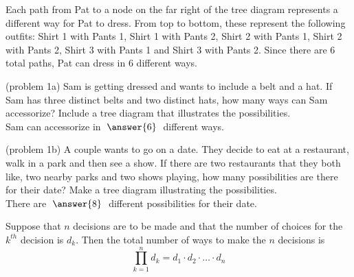 \documentclass[handout]{ximera}
\begin{document}
\begin{example}[example 1]

Each path from Pat to a node on the far right of the tree diagram represents a different way for Pat to dress. From top to bottom, 
these represent the following outfits: Shirt 1 with Pants 1, Shirt 1 with Pants 2, Shirt 2 with Pants 1, 
Shirt 2 with Pants 2, Shirt 3 with Pants 1 and Shirt 3 with Pants 2. 
Since there are 6 total paths, Pat can dress in 6 different ways.

\end{example}

\begin{problem}(problem 1a)
Sam is getting dressed and wants to include a belt and a hat.  
If Sam has three distinct belts and two distinct hats, how many ways
can Sam accessorize? Include a tree diagram that illustrates the possibilities.\\
Sam can accessorize in $\; \answer{6} \;$ different ways.
\end{problem}

\begin{problem}(problem 1b)
A couple wants to go on a date.  They decide to  eat at a restaurant, walk in a park and then see a show.
If there are two restaurants that they both like, two nearby parks and two shows playing, 
how many possibilities are there for their date? Make a tree diagram illustrating the possibilities.\\
There are $\;\answer{8}\;$ different possibilities for their date.
\end{problem}


\begin{theorem}
Suppose that $n$ decisions are to be made and that the number of choices for the $k^{th}$ decision is $d_k$.
Then the total number of ways to make the $n$ decisions is
\[
\prod_{k=1}^n d_k = d_1 \cdot d_2 \cdot \ldots \cdot d_n
\]
\end{theorem}
\end{document}
